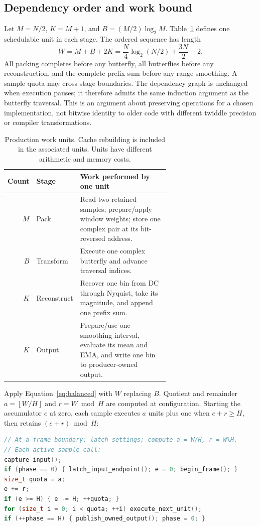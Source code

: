 \documentclass[11pt,letterpaper]{article}
\newcommand{\floor}[1]{\left\lfloor #1\right\rfloor}
\begin{document}
\subsection{Dependency order and work bound}
Let $M=N/2$, $K=M+1$, and $B=(M/2)\log_2 M$. Table~\ref{tab:units} defines
one schedulable unit in each stage. The ordered sequence has length
\begin{equation}
 W=M+B+2K=\frac{N}{4}\log_2(N/2)+\frac{3N}{2}+2.
 \label{eq:wholework}
\end{equation}
All packing completes before any butterfly, all butterflies before any
reconstruction, and the complete prefix sum before any range smoothing. A
sample quota may cross stage boundaries. The dependency graph is unchanged
when execution pauses; it therefore admits the same induction argument as
the butterfly traversal. This is an argument about preserving operations for
a chosen implementation, not bitwise identity to older code with different
twiddle precision or compiler transformations.

\begin{table}[tb]
\centering\small
\begin{tabular}{@{}rlp{0.64\linewidth}@{}}
\toprule
Count & Stage & Work performed by one unit \\
\midrule
$M$ & Pack & Read two retained samples; prepare/apply window weights; store one complex pair at its bit-reversed address. \\
$B$ & Transform & Execute one complex butterfly and advance traversal indices. \\
$K$ & Reconstruct & Recover one bin from DC through Nyquist, take its magnitude, and append one prefix sum. \\
$K$ & Output & Prepare/use one smoothing interval, evaluate its mean and EMA, and write one bin to producer-owned output. \\
\bottomrule
\end{tabular}
\caption{Production work units. Cache rebuilding is included in the associated units. Units have different arithmetic and memory costs.}
\label{tab:units}
\end{table}

Apply Equation~\eqref{eq:balanced} with $W$ replacing $B$. Quotient and
remainder $a=\floor{W/H}$ and $r=W\bmod H$ are computed at configuration.
Starting the accumulator $e$ at zero, each sample executes $a$ units plus one
when $e+r\ge H$, then retains $(e+r)\bmod H$:
\begin{lstlisting}[language=C++,caption={Balanced one-hop dispatch. execute\_next\_unit retains stage and traversal state; output stays private until publication.},label={lst:whole-hop}]
// At a frame boundary: latch settings; compute a = W/H, r = W%H.
// Each active sample call:
capture_input();
if (phase == 0) { latch_input_endpoint(); e = 0; begin_frame(); }
size_t quota = a;
e += r;
if (e >= H) { e -= H; ++quota; }
for (size_t i = 0; i < quota; ++i) execute_next_unit();
if (++phase == H) { publish_owned_output(); phase = 0; }
\end{lstlisting}
\end{document}
